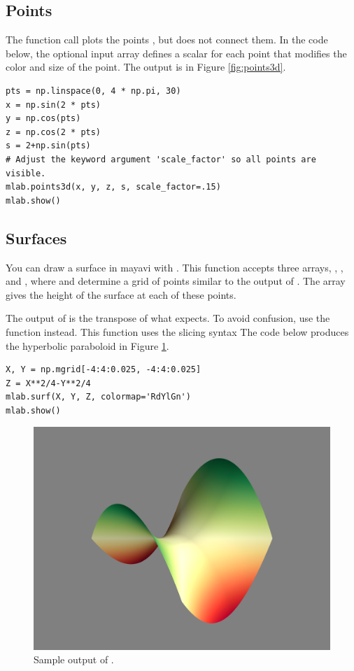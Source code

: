 \subsection*{Points} %

The function call  plots the points , but does not connect them. 
In the code below, the optional input array  defines a scalar for each point that modifies the color and size of the point.
The output is in Figure \ref{fig:points3d}.

\begin{lstlisting}
pts = np.linspace(0, 4 * np.pi, 30)
x = np.sin(2 * pts)
y = np.cos(pts)
z = np.cos(2 * pts)
s = 2+np.sin(pts)
# Adjust the keyword argument 'scale_factor' so all points are visible.
mlab.points3d(x, y, z, s, scale_factor=.15)
mlab.show()
\end{lstlisting}

\subsection*{Surfaces} %

You can draw a surface in mayavi with .
This function accepts three arrays, , , and , where  and  determine a grid of points similar to the output of .
The array  gives the height of the surface at each of these points.

The output of  is the transpose of what  expects.
To avoid confusion, use the function  instead.
This function uses the slicing syntax  
The code below produces the hyperbolic paraboloid in Figure \ref{fig:surf_example}.

\begin{lstlisting}
X, Y = np.mgrid[-4:4:0.025, -4:4:0.025]
Z = X**2/4-Y**2/4
mlab.surf(X, Y, Z, colormap='RdYlGn')
mlab.show()
\end{lstlisting}

\begin{figure}
\includegraphics[width=.7\textwidth]{mesh_example.png}
\caption{Sample output of .}
\label{fig:surf_example}
\end{figure}

